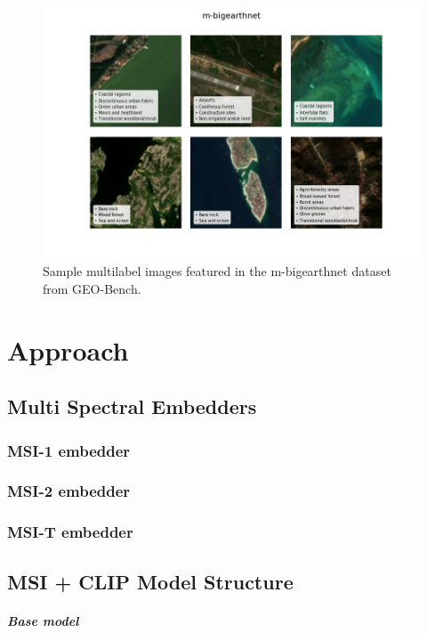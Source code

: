 \documentclass[a4paper, oneside, english]{sapthesis}
\begin{document}
\begin{figure}[h]
    \centering
    \includegraphics[width=\textwidth]{img/m-bigearthnet_image_grid.png}
    \caption{Sample multilabel images featured in the m-bigearthnet dataset from GEO-Bench.}
    \label{fig:bengrid}
\end{figure}


\chapter{Approach} %

\section{Multi Spectral Embedders}

\subsection{MSI-1 embedder}
\subsection{MSI-2 embedder}
\subsection{MSI-T embedder}

\section{MSI + CLIP Model Structure}

\paragraph{Base model}
\end{document}

